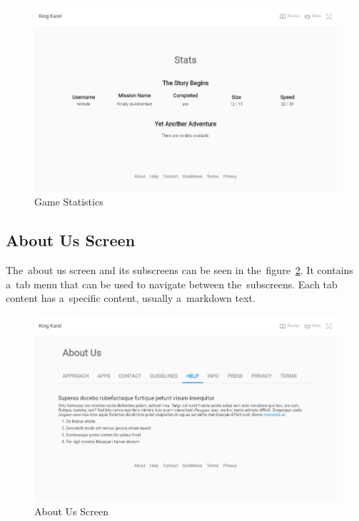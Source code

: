 \begin{figure}
    \centering
    \includegraphics[width=1\linewidth]{assets/implementation/ui/kingkarel_stats.jpeg}
    \caption{Game Statistics}
    \label{fig:implementation:ui:stats}
\end{figure}

\subsection{About Us Screen}

The~about us screen and its subscreens can be seen in the~figure~\ref{fig:implementation:ui:aboutus}.
It contains a~tab menu that can be used to navigate between the~subscreens.
Each tab content has a~specific content, usually a~markdown text.

\begin{figure}
    \centering
    \includegraphics[width=1\linewidth]{assets/implementation/ui/kingkarel_aboutus.jpeg}
    \caption{About Us Screen}
    \label{fig:implementation:ui:aboutus}
\end{figure}
